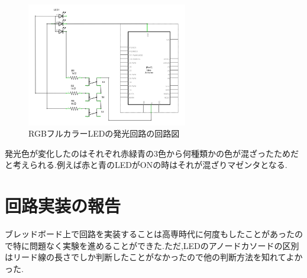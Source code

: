 \documentclass{jarticle}
\begin{document}
\begin{figure}[H]
\begin{center}
\includegraphics[width=7.0cm]{images/hatten2-1-2_回路図.png}
\caption{RGBフルカラーLEDの発光回路の回路図}
\label{fig:hatten2-1-2-kairo}
\end{center}
\end{figure}

発光色が変化したのはそれぞれ赤緑青の3色から何種類かの色が混ざったためだと考えられる.例えば赤と青のLEDがONの時はそれが混ざりマゼンタとなる.
\section{回路実装の報告}
ブレッドボード上で回路を実装することは高専時代に何度もしたことがあったので特に問題なく実験を進めることができた.ただ,LEDのアノードカソードの区別はリード線の長さでしか判断したことがなかったので他の判断方法を知れてよかった.
\end{document}
